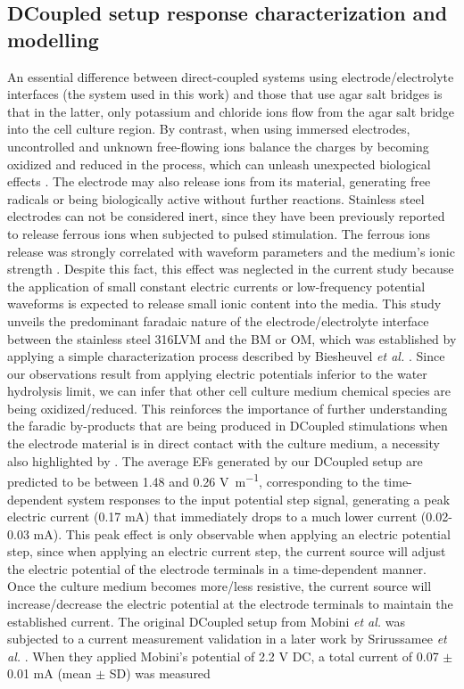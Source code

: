 \subsection{DCoupled setup response characterization and modelling}
An essential difference between direct-coupled systems using electrode/electrolyte interfaces (the system used in this work) and those that use agar salt bridges \cite{Song2007-qr} is that in the latter, only potassium and chloride ions flow from the agar salt bridge into the cell culture region. By contrast, when using immersed electrodes, uncontrolled and unknown free-flowing ions balance the charges by becoming oxidized and reduced in the process, which can unleash unexpected biological effects \cite{Srirussamee2019-ai, Srirussamee2021-cj}. The electrode may also release ions from its material, generating free radicals or being biologically active without further reactions. Stainless steel electrodes can not be considered inert, since they have been previously reported to release ferrous ions when subjected to pulsed stimulation. The ferrous ions release was strongly correlated with waveform parameters and the medium's ionic strength \cite{Tomov2000-db}. Despite this fact, this effect was neglected in the current study because the application of small constant electric currents or low-frequency potential waveforms is expected to release small ionic content into the media. This study unveils the predominant faradaic nature of the electrode/electrolyte interface between the stainless steel 316LVM and the BM or OM, which was established by applying a simple characterization process described by Biesheuvel \textit{et al.} \cite{Biesheuvel2018-wu}. Since our observations result from applying electric potentials inferior to the water hydrolysis limit, we can infer that other cell culture medium chemical species are being oxidized/reduced. This reinforces the importance of further understanding the faradic by-products that are being produced in \ac{DCoupled} stimulations when the electrode material is in direct contact with the culture medium, a necessity also highlighted by \cite{Srirussamee2019-ai, Tomov2000-db}. The average \acs{EF}s generated by our \ac{DCoupled} setup are predicted to be between 1.48 and 0.26 \si{\volt\per\meter}, corresponding to the time-dependent system responses to the input potential step signal, generating a peak electric current (0.17 \si{\milli\ampere}) that immediately drops to a much lower current (0.02-0.03 \si{\milli\ampere}). This peak effect is only observable when applying an electric potential step, since when applying an electric current step, the current source will adjust the electric potential of the electrode terminals in a time-dependent manner. Once the culture medium becomes more/less resistive, the current source will increase/decrease the electric potential at the electrode terminals to maintain the established current. The original \ac{DCoupled} setup from Mobini \textit{et al.} \cite{Mobini2016-jh} was subjected to a current measurement validation in a later work by Srirussamee \textit{et al.} \cite{Srirussamee2019-ai}. When they applied Mobini’s potential of 2.2 \si{\volt} DC, a total current of 0.07 $\pm$ 0.01 \si{\milli\ampere} (mean $\pm$ SD) was measured 